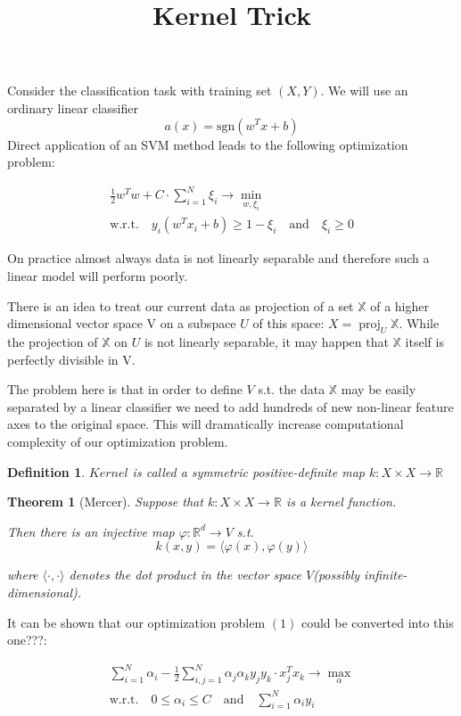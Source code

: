 \documentclass{article}
\DeclareMathOperator{\proj}{proj}
\theoremstyle{bfnote}
\newtheorem{defi}{Definition}
\newtheorem{thm}{Theorem}
\begin{document}
	\title{Kernel Trick}
	Consider the classification task with training set $(X, Y)$. 
	We will use an ordinary linear classifier $$a(x)=\text{sgn}(w^T x + b)$$ Direct application of an SVM method leads to the following optimization problem:
	
	\begin{gather}
	\frac{1}{2} w^T w + C \cdot \sum_{i=1}^N {\xi_i} \rightarrow \min\limits_{w, \xi_i} \\
	\text{w.r.t.} \quad y_i(w^T x_i + b) \ge 1-\xi_i \quad \text{and} \quad \xi_i \ge 0 
	\end{gather}
	
	On practice almost always data is not linearly separable and therefore such a linear model will perform poorly.
	
	There is an idea to treat our current data as projection of a set $\mathbb{X}$ of a higher dimensional vector space V on a subspace $U$ of this space: $X=\proj_U \mathbb{X}$. While the projection of $\mathbb{X}$ on $U$ is not linearly separable, it may happen that $\mathbb{X}$ itself is perfectly divisible in V.
	
	The problem here is that in order to define $V$ s.t. the data $\mathbb{X}$ may be easily separated by a linear classifier
	we need to add hundreds of new non-linear feature axes to the original space. This will dramatically increase computational complexity of our optimization problem.
	
	\begin{defi}
	$\textit{Kernel}$ is called a symmetric positive-definite map $k: X \times X \rightarrow \mathbb{R}$
	\end{defi}
	
	\begin{thm}[Mercer]
		
		Suppose that $k: X \times X \rightarrow \mathbb{R}$ is a kernel function.

		Then there is an injective map $\varphi: \mathbb{R}^d \rightarrow V$ s.t. 
		$$k(x, y) = \langle \varphi(x), \varphi(y) \rangle$$ 
		
		where $\langle \cdot , \cdot \rangle$ denotes the dot product in the vector space $V$(possibly infinite-dimensional).
		
	\end{thm}	

	
	It can be shown that our optimization problem $(1)$ could be converted into this one???:
	
	\begin{gather}
	\sum_{i=1}^N {\alpha_i} - \frac{1}{2}\sum_{i,j=1}^N \alpha_j \alpha_k y_j y_k \cdot x_j^T x_k
	\rightarrow \max\limits_{\alpha} \\
	\text{w.r.t.} \quad 0 \le \alpha_i \le C \quad \text{and} \quad \sum_{i=1}^N \alpha_i y_i
	\end{gather}
	
\end{document}

